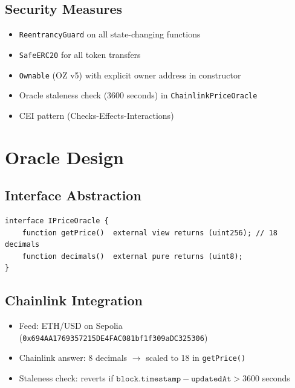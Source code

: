 \documentclass[11pt,a4paper]{article}
\begin{document}
\subsection{Security Measures}

\begin{itemize}
    \item \texttt{ReentrancyGuard} on all state-changing functions
    \item \texttt{SafeERC20} for all token transfers
    \item \texttt{Ownable} (OZ v5) with explicit owner address in constructor
    \item Oracle staleness check (3600 seconds) in \texttt{ChainlinkPriceOracle}
    \item CEI pattern (Checks-Effects-Interactions)
\end{itemize}

\section{Oracle Design}

\subsection{Interface Abstraction}

\begin{lstlisting}[style=solidity, caption={\texttt{IPriceOracle} interface.}]
interface IPriceOracle {
    function getPrice()  external view returns (uint256); // 18 decimals
    function decimals()  external pure returns (uint8);
}
\end{lstlisting}

\subsection{Chainlink Integration}

\begin{itemize}
    \item Feed: ETH/USD on Sepolia (\texttt{0x694AA1769357215DE4FAC081bf1f309aDC325306})
    \item Chainlink answer: 8 decimals $\rightarrow$ scaled to 18 in \texttt{getPrice()}
    \item Staleness check: reverts if $\texttt{block.timestamp} - \texttt{updatedAt} > 3600$ seconds
\end{itemize}
\end{document}
